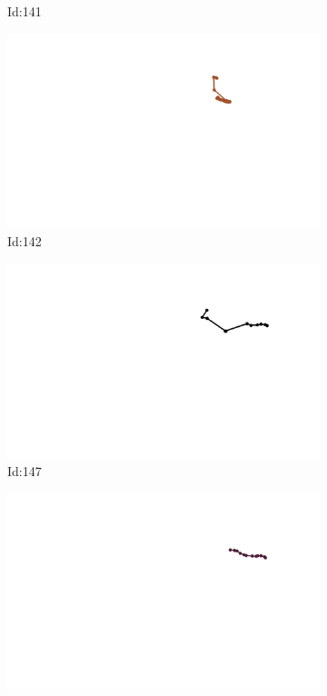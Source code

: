 \documentclass[12pt,twoside]{report}
\begin{document}
\begin{figure}
\begin{subfigure}[b]{0.20\textwidth}
\caption{Id:141}
\end{subfigure}
\begin{subfigure}[b]{0.20\textwidth}
\centering
\includegraphics[width=\textwidth]{../trajectories/142.png}
\caption{Id:142}
\end{subfigure}
\begin{subfigure}[b]{0.20\textwidth}
\centering
\includegraphics[width=\textwidth]{../trajectories/147.png}
\caption{Id:147}
\end{subfigure}
\begin{subfigure}[b]{0.20\textwidth}
\centering
\includegraphics[width=\textwidth]{../trajectories/148.png}

\end{subfigure}
\end{figure}
\end{document}
